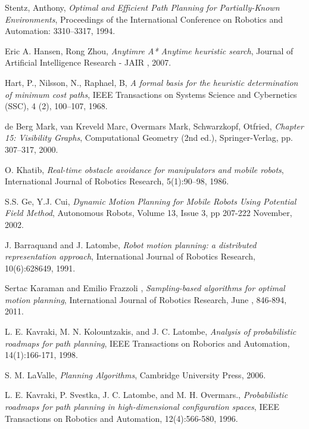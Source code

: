 \documentclass[MTech]{iitmdiss}
\begin{document}
\begin{thebibliography}{99}
	Stentz, Anthony,
  \emph{Optimal and Efficient Path Planning for Partially-Known Environments},
	Proceedings of the International Conference on Robotics and Automation: 3310–3317,
	 1994.
	 
	 
	Eric A. Hansen, Rong Zhou,
  \emph{Anytimre A* Anytime heuristic search},
	 Journal of Artificial Intelligence Research - JAIR ,
	 2007.
	 
	Hart, P., Nilsson, N., Raphael, B,
  \emph{A formal basis for the heuristic determination of
minimum cost paths},
	 IEEE Transactions on Systems Science and Cybernetics (SSC),
4 (2), 100–107,
	 1968.	 
	 

	de Berg Mark, van Kreveld Marc, Overmars Mark, Schwarzkopf, Otfried,
  \emph{Chapter 15: Visibility Graphs},
	 Computational Geometry (2nd ed.), Springer-Verlag, pp. 307–317,
	 2000.	 
	 

	O. Khatib,
  \emph{Real-time obstacle avoidance for manipulators and mobile robots},
	 International Journal of Robotics Research, 5(1):90–98,
	 1986.	 



	S.S. Ge, Y.J. Cui,
  \emph{Dynamic Motion Planning for Mobile Robots Using Potential Field Method},
	Autonomous Robots, Volume 13, Issue 3, pp 207-222 November,
	 2002.	 

	J. Barraquand and J. Latombe,
  \emph{Robot motion planning: a distributed representation approach},
	International Journal of Robotics Research, 10(6):628649,
	1991.	 


	Sertac Karaman and Emilio Frazzoli ,
  \emph{Sampling-based algorithms for optimal motion planning},
	International Journal of Robotics Research, June , 846-894,
	2011.	 

	L. E. Kavraki, M. N. Kolountzakis, and J. C. Latombe,
  \emph{Analysis of probabilistic roadmaps for path planning},
	IEEE Transactions on Roborics and Automation, 14(1):166-171,
	1998.	 
	
	S. M. LaValle,
  \emph{Planning Algorithms},
	Cambridge University Press,
	2006.	 


	L. E. Kavraki, P. Svestka, J. C. Latombe, and M. H. Overmars.,
  \emph{Probabilistic roadmaps for path planning in high-dimensional configuration spaces},
	IEEE Transactions on Robotics and Automation, 12(4):566-580,
	1996.	 


\end{thebibliography}
\end{document}

